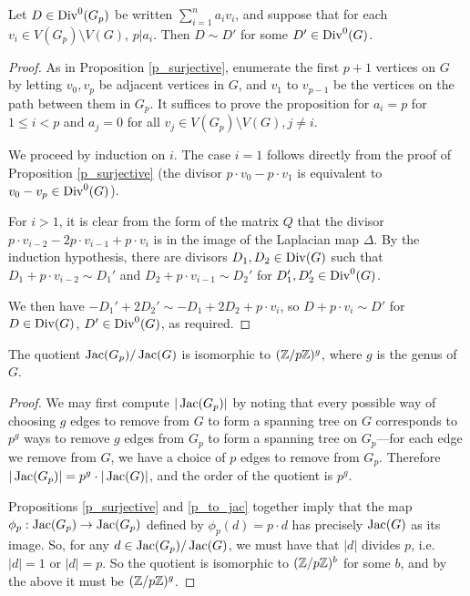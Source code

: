 \documentclass{amsart}
\begin{document}
\begin{prop}
  \label{p_to_jac}
  Let $D \in \operatorname{Div}^0(G_p)$ be written $\sum_{i=1}^na_iv_i$, and
  suppose that for each $v_i \in V(G_p) \setminus V(G)$, $p |
  a_i$. Then $D \sim D'$ for some $D' \in \operatorname{Div}^0(G)$. 
\end{prop}
\begin{proof}
  As in Proposition \ref{p_surjective}, enumerate the first $p+1$
  vertices on $G$ by letting $v_0, v_p$ be adjacent vertices in $G$,
  and $v_1$ to $v_{p-1}$ be the vertices on the path between them in
  $G_p$. It suffices to prove the proposition for $a_i = p$ for $1 \le
  i < p$ and $a_j = 0$ for all $v_j \in V(G_p) \setminus V(G), j \ne
  i$.

  We proceed by induction on $i$. The case $i=1$ follows directly from
  the proof of Proposition \ref{p_surjective} (the divisor $p \cdot
  v_0 - p \cdot v_1$ is equivalent to $v_0 - v_p \in \operatorname{Div}^0(G)$).

  For $i > 1$, it is clear from the form of the matrix $Q$ that the
  divisor $p \cdot v_{i-2} - 2p \cdot v_{i-1} + p \cdot v_i$ is in
  the image of the Laplacian map $\Delta$. By the induction
  hypothesis, there are divisors $D_1, D_2 \in \operatorname{Div}(G)$ such that
  $D_1 + p \cdot v_{i-2} \sim D_1'$ and $D_2 + p \cdot v_{i-1} \sim
  D_2'$ for $D_1', D_2' \in \operatorname{Div}^0(G)$. 

  We then have $-D_1' + 2D_2' \sim -D_1 + 2D_2 + p \cdot v_i$, so
  $D + p \cdot v_i \sim D'$ for $D \in \operatorname{Div}(G)$, $D' \in \operatorname{Div}^0(G)$,
  as required.
\end{proof}

\begin{cor}
  \label{quotient_cor}
  The quotient $\operatorname{Jac}(G_p) / \operatorname{Jac}(G)$ is isomorphic to $(\mathbb{Z}/p\mathbb{Z})^g$,
  where $g$ is the genus of $G$.
\end{cor}
\begin{proof}
  We may first compute $|\operatorname{Jac}(G_p)|$ by noting that every possible way
  of choosing $g$ edges to remove from $G$ to form a spanning tree on
  $G$ corresponds to $p^g$ ways to remove $g$ edges from $G_p$ to form
  a spanning tree on $G_p$---for each edge we remove from $G$, we have
  a choice of $p$ edges to remove from $G_p$. Therefore $|\operatorname{Jac}(G_p)| =
  p^g \cdot |\operatorname{Jac}(G)|$, and the order of the quotient is $p^g$.

  Propositions \ref{p_surjective} and \ref{p_to_jac} together imply
  that the map $\phi_p : \operatorname{Jac}(G_p) \to \operatorname{Jac}(G_p)$ defined by
  $\phi_p(d) = p \cdot d$ has precisely $\operatorname{Jac}(G)$ as its image. So,
  for any $d \in \operatorname{Jac}(G_p) / \operatorname{Jac}(G)$, we must have that $|d|$ divides
  $p$, i.e. $|d| = 1$ or $|d| = p$. So the quotient is isomorphic to
  $(\mathbb{Z}/p\mathbb{Z})^b$ for some $b$, and by the above it must be
  $(\mathbb{Z}/p\mathbb{Z})^g$. 
\end{proof}
\end{document}
